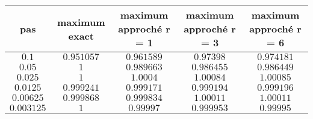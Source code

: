 \documentclass[11pt,a4paper]{report}
\begin{document}
				\begin{center}
					\begin{tabular}{|c|c|c|c|c|}
						\hline
						pas & maximum exact & maximum approché r = 1 & maximum approché r = 3 & maximum approché r = 6 \\
						\hline 
						$0.1$ & $ 0.951057 $ & $ 0.961589 $ & $ 0.97398 $ & $ 0.974181 $ \\ 
						\hline 
						$0.05$ & $ 1 $ & $ 0.989663 $ & $ 0.986455 $ & $ 0.986449 $\\ 
						\hline 
						$0.025$ & $ 1 $ & $ 1.0004 $ & $ 1.00084 $ & $ 1.00085 $  \\ 
						\hline 
						$0.0125$ & $ 0.999241 $ & $ 0.999171 $ & $ 0.999194 $ & $ 0.999196 $\\ 
						\hline
						$0.00625$ & $ 0.999868 $ & $ 0.999834 $ & $ 1.00011 $ & $ 1.00011 $ \\ 
						\hline 
						$0.003125$ & $ 1 $ & $ 0.99997 $ & $ 0.999953 $ & $ 0.99995 $ \\ 
						\hline 
					\end{tabular} 
				\end{center}
\end{document}
